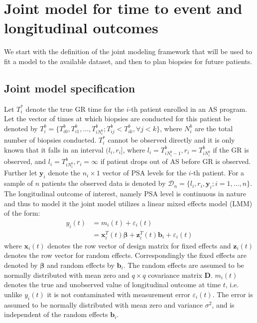 
\section{Joint model for time to event and longitudinal outcomes}
\label{sec : jm_framework}
We start with the definition of the joint modeling framework that will be used to fit a model to the available dataset, and then to plan biopsies for future patients.

\subsection{Joint model specification}
\label{subsec : jm_specification}
Let $T_i^*$ denote the true GR time for the $i$-th patient enrolled in an AS program. Let the vector of times at which biopsies are conducted for this patient be denoted by $T_i^b = \{T^b_{i0}, T^b_{i1}, \ldots, T^b_{i{N_i^b}}; T^b_{ij} < T^b_{ik}, \forall j<k\}$, where $N_i^b$ are the total number of biopsies conducted. $T_i^*$ cannot be observed directly and it is only known that it falls in an interval $(l_i, r_i]$, where $l_i = T^b_{i{N_i^b - 1}}, r_i = T^b_{i{N_i^b}}$ if the GR is observed, and $l_i = T^b_{i{N_i^b}}, r_i=\infty$ if patient drops out of AS before GR is observed. Further let $\boldsymbol{y}_i$ denote the $n_i \times 1$  vector of PSA levels for the $i$-th patient. For a sample of $n$ patients the observed data is denoted by $\mathcal{D}_n = \{l_i, r_i, \boldsymbol{y}_i; i = 1, \ldots, n\}$.\\

The longitudinal outcome of interest, namely PSA level is continuous in nature and thus to model it the joint model utilizes a linear mixed effects model (LMM) of the form:
\begin{equation*}
\begin{split}
y_i(t) &= m_i(t) + \varepsilon_i(t)\\
&=\boldsymbol{x}_i^T(t) \boldsymbol{\beta} + \boldsymbol{z}_i^T(t) \boldsymbol{b}_i + \varepsilon_i(t)
\end{split}
\end{equation*}
where $\boldsymbol{x}_i(t)$ denotes the row vector of design matrix for fixed effects and $\boldsymbol{z}_i(t)$ denotes the row vector for random effects. Correspondingly the fixed effects are denoted by $\boldsymbol{\beta}$ and random effects by $\boldsymbol{b}_i$. The random effects are assumed to be normally distributed with mean zero and $q \times q$ covariance matrix $\boldsymbol{D}$. $m_i(t)$ denotes the true and unobserved value of longitudinal outcome at time $t$, i.e. unlike $y_i(t)$ it is not contaminated with measurement error $\varepsilon_i(t)$. The error is assumed to be normally distributed with mean zero and variance $\sigma^2$, and is independent of the random effects $\boldsymbol{b}_i$.\\

